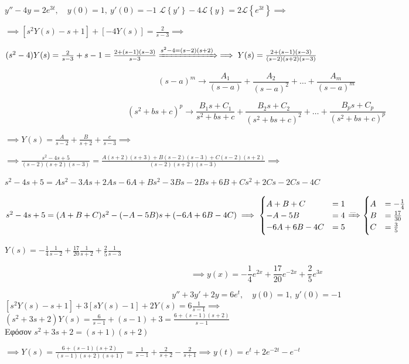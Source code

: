 \documentclass[11pt,a4paper,titlepage,final]{article}
\begin{document}
\begin{exercise*}{12.5}
	\( y''-4y=2e^{3t},\quad y(0)=1,\ y'(0)=-1 \)
	\tcblower
	\( \mathscr L \left\lbrace y' \right\rbrace -4\mathscr L \left\lbrace y \right\rbrace = 2 \mathscr L\left\lbrace e^{3t} \right\rbrace \implies \)
	
	\( \implies \left[
	s^2Y(s)-s+1
	\right] + \left[-4Y(s)\right] = \frac{2}{s-3} \implies \)
	
	\( (s^2-4)Y(s) = \frac{2}{s-3}+s-1=\frac{2+(s-1)(s-3)}{s-3} \xRightarrow{s^2-4=(s-2)(s+2)} \implies Y(s) = \frac{2+(s-1)(s-3)}{(s-2)(s+2)(s-3)} \)
	
	\begin{attnbox}{}
		\[
		(s-a)^m \rightarrow \frac{A_1}{(s-a)}+\frac{A_2}{(s-a)^2}+\dots + \frac{A_m}{(s-a)^m}
		\]
		
		\[
		(s^2+bs+c)^p \rightarrow 
		\frac{B_1s+C_1}{s^2+bs+c} + \frac{B_2s+C_2}{(s^2+bs+c)^2} + \dots + \frac{B_ps+C_p}{(s^2+bs+c)^p}
		\]
	\end{attnbox}
	
	\( \implies Y(s) = \frac{A}{s-2}+\frac{B}{s+2} + \frac{c}{s-3} \implies  \)
	
	\( \implies \frac{s^2-4s+5}{(s-2)(s+2)(s-3)} = \frac{A(s+2)(s+3)+B(s-2)(s-3)+C(s-2)(s+2)}{(s-2)(s+2)(s-3)} \implies \)
	
	\( s^2-4s+5 = As^2-3As+2As-6A +Bs^2-3Bs-2Bs+6B+Cs^2+2Cs-2Cs-4C \)
	
	\( s^2-4s+5 = (A+B+C)s^2 - (-A-5B)s + (-6A+6B-4C) \implies \begin{cases}
	A+B+C &= 1 \\
	-A-5B &= 4 \\
	-6A +6B -4C &= 5
	\end{cases} \xRightarrow{\dots} \begin{cases}
	A &= -\frac{1}{4} \\
	B &= \frac{17}{30} \\
	C &= \frac{3}{5}
	\end{cases} \)
	
	\( Y(s) = -\frac{1}{4}\frac{1}{s-2} + \frac{17}{20} \frac{1}{s+2} + \frac{2}{5}\frac{1}{s-3} \) 
	
	\[ \implies \boxed{ y(x) = -\frac{1}{4}e^{2x}+\frac{17}{20}e^{-2x}+\frac{2}{5}e^{3x}} \]
\end{exercise*}

\begin{exercise*}{12.6}
	\[
	y''+3y'+2y=6e^t,\quad y(0) = 1,\ y'(0) = -1
	\]
	\tcblower
	\( \left[s^2Y(s)-s+1\right] +3\left[sY(s)-1\right]+2Y(s) = 6\frac{1}{s-1}
	\implies \) \\
	\( (s^2+3s+2)Y(s) = \frac{6}{s-1}+(s-1)+3 = \frac{6+(s-1)(s+2)}{s-1} \) \\
	Εφόσον \( s^2+3s+2=(s+1)(s+2) \)
	
	\( \implies Y(s) = \frac{6+(s-1)(s+2)}{(s-1)(s+2)(s+1)} 
	= \frac{1}{s-1}+\frac{2}{s+2}-\frac{2}{s+1}
	\implies \boxed{ y(t) = e^t+2e^{-2t}-e^{-t} }
	\)
\end{exercise*}
\end{document}
